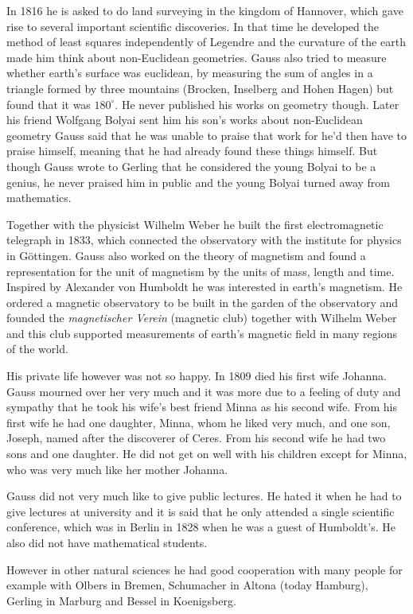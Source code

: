 \documentclass[12pt]{article}
\begin{document}
In 1816 he is asked to do land surveying in the kingdom of Hannover, which gave rise to several important scientific discoveries. In that time he developed the method of least squares independently of Legendre and the curvature of the earth made him think about non-Euclidean geometries. Gauss also tried to measure whether earth's surface was euclidean, by measuring the sum of angles in a triangle formed by three mountains (Brocken, Inselberg and Hohen Hagen) but found that it was $180^\circ$. He never published his works on geometry though. Later his friend Wolfgang Bolyai sent him his son's works about non-Euclidean geometry Gauss said that he was unable to praise that work for he'd then have to praise himself, meaning that he had already found these things himself. But though Gauss wrote to Gerling that he considered the young Bolyai to be a genius, he never praised him in public and the young Bolyai turned away from mathematics.

Together with the physicist Wilhelm Weber he built the first electromagnetic telegraph in 1833, which connected the observatory with the institute for physics in G\"ottingen. Gauss also worked on the theory of magnetism and found a representation for the unit of magnetism by the units of mass, length and time. Inspired by Alexander von Humboldt he was interested in earth's magnetism. He ordered a magnetic observatory to be built in the garden of the observatory and founded the \textit{magnetischer Verein} (magnetic club) together with Wilhelm Weber and this club supported measurements of earth's magnetic field in many regions of the world.

His private life however was not so happy. In 1809 died his first wife Johanna. Gauss mourned over her very much and it was more due to a feeling of duty and sympathy that he took his wife's best friend Minna as his second wife. From his first wife he had one daughter, Minna, whom he liked very much, and one son, Joseph, named after the discoverer of Ceres. 
From his second wife he had two sons and one daughter. He did not get on well with his children except for Minna, who was very much like her mother Johanna.

Gauss did not very much like to give public lectures. He hated it when he had to give lectures at university and it is said that he only attended a single scientific conference, which was in Berlin in 1828 when he was a guest of Humboldt's. He also did not have mathematical students.

However in other natural sciences he had good cooperation with many people for example with Olbers in Bremen, Schumacher in Altona (today Hamburg), Gerling in Marburg and Bessel in Koenigsberg.
\end{document}
